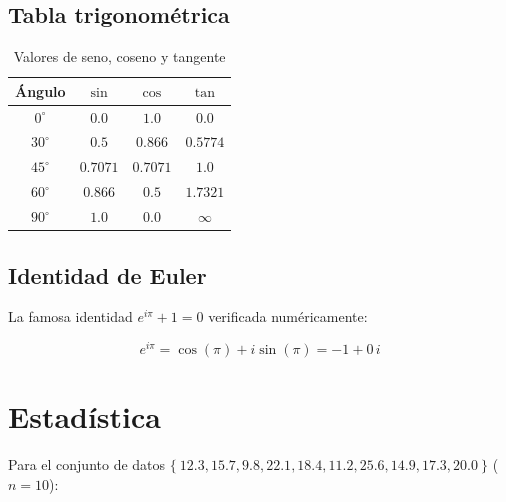\documentclass[12pt, a4paper]{article}
\begin{document}
\subsection{Tabla trigonométrica}

\begin{table}[h]
  \centering
  \caption{Valores de seno, coseno y tangente}
  \begin{tabular}{c c c c}
    \toprule
    Ángulo & $\sin$ & $\cos$ & $\tan$ \\
    \midrule
    $0^{\circ}$ & $0.0$ & $1.0$ & $0.0$ \\
    $30^{\circ}$ & $0.5$ & $0.866$ & $0.5774$ \\
    $45^{\circ}$ & $0.7071$ & $0.7071$ & $1.0$ \\
    $60^{\circ}$ & $0.866$ & $0.5$ & $1.7321$ \\
    $90^{\circ}$ & $1.0$ & $0.0$ & $\infty$ \\

    \bottomrule
  \end{tabular}
\end{table}

\subsection{Identidad de Euler}

La famosa identidad $e^{i\pi} + 1 = 0$ verificada numéricamente:

\[
  e^{i\pi} = \cos(\pi) + i\sin(\pi)
           = -1 + 0\,i
\]


\section{Estadística}

%
%
%

Para el conjunto de datos $\{\ 12.3, 15.7, 9.8, 22.1, 18.4, 11.2, 25.6, 14.9, 17.3, 20.0\ \}$ ($n = 10$):
\end{document}
